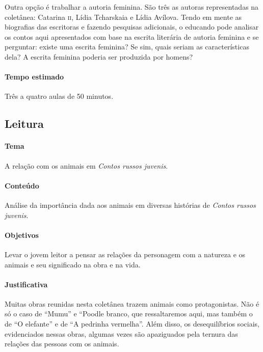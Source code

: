\documentclass[11pt]{extarticle}
\begin{document}
Outra opção é trabalhar a autoria feminina. São três as autoras
representadas na coletânea: Catarina \textsc{ii}, Lídia Tcharskaia e Lídia
Avílova. Tendo em mente as biografias das escritoras e fazendo pesquisas
adicionais, o educando pode analisar os contos aqui apresentados com
base na escrita literária de autoria feminina e se perguntar: existe uma
escrita feminina? Se sim, quais seriam as características dela? A
escrita feminina poderia ser produzida por homens?


\paragraph{Tempo estimado} Três a quatro aulas de 50 minutos.


\subsection{Leitura}


\paragraph{Tema} A relação com os animais em \emph{Contos russos juvenis}.


\paragraph{Conteúdo}
Análise da importância dada aos animais em diversas histórias de
\emph{Contos russos juvenis}.

\paragraph{Objetivos}
Levar o jovem leitor a pensar as relações da personagem com a natureza e
os animais e seu significado na obra e na vida.

\paragraph{Justificativa}
Muitas obras reunidas nesta coletânea trazem animais como protagonistas.
Não é só o caso de ``Mumu'' e ``Poodle branco, que ressaltaremos aqui,
mas também o de ``O elefante'' e de ``A pedrinha vermelha''. Além
disso, os desequilíbrios sociais, evidenciados nessas obras, algumas
vezes são apaziguados pela ternura das relações das pessoas com os
animais.
\end{document}
